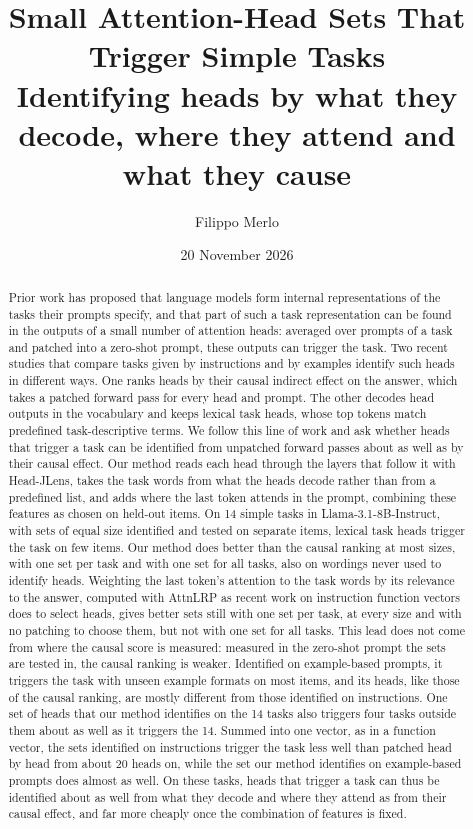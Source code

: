 \documentclass[10pt,a4paper]{article}
\title{Small Attention-Head Sets That Trigger Simple Tasks\\[3pt]
\large Identifying heads by what they decode, where they attend and what they cause}
\author{Filippo Merlo}
\date{20 November 2026}
\begin{document}
\maketitle

\begin{abstract}
Prior work has proposed that language models form internal representations of the tasks their prompts specify, and that part of such a task representation can be found in the outputs of a small number of attention heads: averaged over prompts of a task and patched into a zero-shot prompt, these outputs can trigger the task. Two recent studies that compare tasks given by instructions and by examples identify such heads in different ways. One ranks heads by their causal indirect effect on the answer, which takes a patched forward pass for every head and prompt. The other decodes head outputs in the vocabulary and keeps lexical task heads, whose top tokens match predefined task-descriptive terms. We follow this line of work and ask whether heads that trigger a task can be identified from unpatched forward passes about as well as by their causal effect. Our method reads each head through the layers that follow it with Head-JLens, takes the task words from what the heads decode rather than from a predefined list, and adds where the last token attends in the prompt, combining these features as chosen on held-out items. On 14 simple tasks in Llama-3.1-8B-Instruct, with sets of equal size identified and tested on separate items, lexical task heads trigger the task on few items. Our method does better than the causal ranking at most sizes, with one set per task and with one set for all tasks, also on wordings never used to identify heads. Weighting the last token's attention to the task words by its relevance to the answer, computed with AttnLRP as recent work on instruction function vectors does to select heads, gives better sets still with one set per task, at every size and with no patching to choose them, but not with one set for all tasks. This lead does not come from where the causal score is measured: measured in the zero-shot prompt the sets are tested in, the causal ranking is weaker. Identified on example-based prompts, it triggers the task with unseen example formats on most items, and its heads, like those of the causal ranking, are mostly different from those identified on instructions. One set of heads that our method identifies on the 14 tasks also triggers four tasks outside them about as well as it triggers the 14. Summed into one vector, as in a function vector, the sets identified on instructions trigger the task less well than patched head by head from about 20 heads on, while the set our method identifies on example-based prompts does almost as well. On these tasks, heads that trigger a task can thus be identified about as well from what they decode and where they attend as from their causal effect, and far more cheaply once the combination of features is fixed.
\end{abstract}
\end{document}

